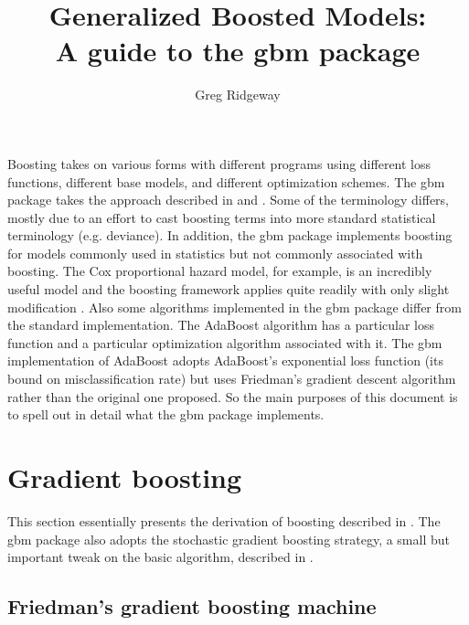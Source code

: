 \documentclass{article}
\title{Generalized Boosted Models:\\A guide to the gbm package}
\author{Greg Ridgeway}
\begin{document}
\maketitle

Boosting takes on various forms with different programs using different loss functions, different base models, and different optimization schemes. The gbm package takes the approach described in \cite{Friedman:2001} and \cite{Friedman:2002}. Some of the terminology differs, mostly due to an effort to cast boosting terms into more standard statistical terminology (e.g. deviance). In addition, the gbm package implements boosting for models commonly used in statistics but not commonly associated with boosting. The Cox proportional hazard model, for example, is an incredibly useful model and the boosting framework applies quite readily with only slight modification \cite{Ridgeway:1999}. Also some algorithms implemented in the gbm package differ from the standard implementation. The AdaBoost algorithm \cite{FreundSchapire:1997} has a particular loss function and a particular optimization algorithm associated with it. The gbm implementation of AdaBoost adopts AdaBoost's exponential loss function (its bound on misclassification rate) but uses Friedman's gradient descent algorithm rather than the original one proposed. So the main purposes of this document is to spell out in detail what the gbm package implements.

\section{Gradient boosting}

This section essentially presents the derivation of boosting described in \cite{Friedman:2001}. The gbm package also adopts the stochastic gradient boosting strategy, a small but important tweak on the basic algorithm, described in \cite{Friedman:2002}.

\subsection{Friedman's gradient boosting machine}
\label{sec:GradientBoostingMachine}
\end{document}
